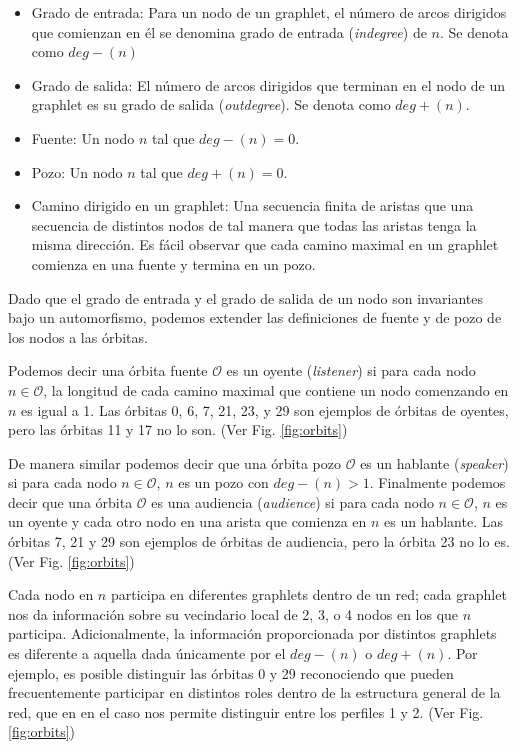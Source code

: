 \begin{itemize}
    \item Grado de entrada: Para un nodo de un graphlet, el número de arcos dirigidos que comienzan en él se denomina grado de entrada (\textit{indegree}) de $n$. Se denota como $deg-(n)$
    \item Grado de salida: El número de arcos dirigidos que terminan en el nodo de un graphlet es su grado de salida (\textit{outdegree}). Se denota como $deg+(n)$.
    \item Fuente: Un nodo $n$ tal que $deg-(n)=0$. 
    \item Pozo: Un nodo $n$ tal que $deg+(n)=0$.
    \item Camino dirigido en un graphlet: Una secuencia finita de aristas que una secuencia de distintos nodos de tal manera que todas las aristas tenga la misma dirección. Es fácil observar que cada camino maximal en un graphlet comienza en una fuente y termina en un pozo. %
\end{itemize}

Dado que el grado de entrada y el grado de salida de un nodo son invariantes bajo un automorfismo, podemos extender las definiciones de fuente y de pozo de los nodos a las órbitas. 

Podemos decir una órbita fuente $\mathcal{O}$ es un oyente (\emph{listener}) si para cada nodo $n\in\mathcal{O}$, la longitud de cada camino maximal que contiene un nodo comenzando en $n$ es igual a 1. Las órbitas 0, 6, 7, 21, 23, y 29 son ejemplos de órbitas de oyentes, pero las órbitas 11 y 17 no lo son. (Ver Fig. \ref{fig:orbits})

De manera similar podemos decir que una órbita pozo $\mathcal{O}$ es un hablante (\emph{speaker}) si para cada nodo  $n\in\mathcal{O}$, $n$ es un pozo con $deg-(n)>1$. Finalmente podemos decir que una órbita $\mathcal{O}$ es una audiencia (\emph{audience}) si para cada nodo $n\in\mathcal{O}$, $n$ es un oyente y cada otro nodo en una arista que comienza en $n$ es un hablante. Las órbitas 7, 21 y 29 son ejemplos de órbitas de audiencia, pero la órbita 23 no lo es. (Ver Fig. \ref{fig:orbits})

Cada nodo en $n$ participa en diferentes graphlets dentro de un red; cada graphlet nos da información sobre su vecindario local de 2, 3, o 4 nodos en los que $n$ participa. Adicionalmente, la información proporcionada por distintos graphlets es diferente a aquella dada únicamente por el $deg-(n)$ o $deg+(n)$. Por ejemplo, es posible distinguir las órbitas 0 y 29 reconociendo que pueden frecuentemente participar en distintos roles dentro de la estructura general de la red, que en en el caso nos permite distinguir entre los perfiles 1 y 2. (Ver Fig. \ref{fig:orbits})


